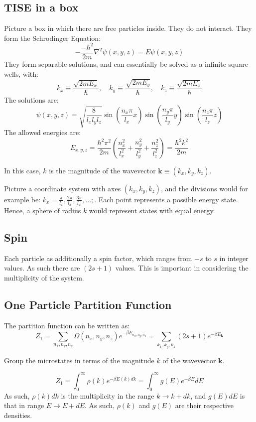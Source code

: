 \documentclass[12pt]{article}
\begin{document}
\subsection{TISE in a box}
Picture a box in which there are free particles inside. They do not interact. They form the Schrodinger Equation:
\[-\frac{-\hbar^2}{2m}\nabla^2\psi(x,y,z) = E\psi(x,y,z)\]
They form separable solutions, and can essentially be solved as a infinite square wells, with:
\[k_x \equiv \frac{\sqrt{2mE_x}}{\hbar}, \quad k_y \equiv \frac{\sqrt{2mE_y}}{\hbar}, \quad k_z \equiv \frac{\sqrt{2mE_z}}{\hbar}\]
The solutions are:
\[ \psi(x,y,z)=\sqrt{\frac{8}{l_xl_yl_z}}\sin(\frac{n_x\pi}{l_x}x)\sin(\frac{n_y\pi}{l_y}y)\sin(\frac{n_z\pi}{l_z}z)\]
The allowed energies are:
\[E_{x,y,z}=\frac{\hbar^2\pi^2}{2m}\left(\frac{n_x^2}{l_x^2}+\frac{n_y^2}{l_y^2}+\frac{n_z^2}{l_z^2}\right) = \frac{\hbar^2 k^2}{2m}\]

In this case, $k$ is the magnitude of the wavevector $\mathbf{k} \equiv (k_x, k_y, k_z)$.

Picture a coordinate system with axes $(k_x,k_y,k_z)$, and the divisions would for example be: $k_x = \frac{\pi}{l_x}, \frac{2\pi}{l_x}, \frac{3\pi}{l_x},...;$. Each point represents a possible energy state. Hence, a sphere of radius $k$ would represent states with equal energy.

\subsection{Spin}
Each particle as additionally a spin factor, which ranges from $-s$ to $s$ in integer values. As such there are $(2s+1)$ values. This is important in considering the multiplicity of the system.

\subsection{One Particle Partition Function}

The partition function can be written as:
\[Z_1 = \sum_{n_x,n_y,n_z} \Omega(n_x,n_y,n_z)e^{-\beta E_{n_x,n_y,n_z}}=\sum_{k_x,k_y,k_z} (2s+1)e^{-\beta E_\mathbf{k}}\]

Group the microstates in terms of the magnitude $k$ of the wavevector $\mathbf{k}$.

\[ Z_1 = \int^\infty_0 \rho(k) e^{-\beta E(k)dk} = \int^\infty_0 g(E) e^{-\beta E}dE\]
As such, $\rho(k)dk$ is the multiplicity in the range $k\to k+dk$, and $g(E)dE$ is that in range $E\to E+dE$. As such, $\rho(k)$ and $g(E)$ are their respective densities.
\end{document}

